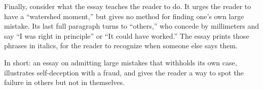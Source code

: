 \begin{afterword}
Finally, consider what the essay teaches the reader to do. It urges the reader to have a ``watershed moment,'' but gives no method for finding one's own large mistake. Its last full paragraph turns to ``others,'' who concede by millimeters and say ``I was right in principle'' or ``It could have worked.'' The essay prints those phrases in italics, for the reader to recognize when someone else says them.

In short: an essay on admitting large mistakes that withholds its own case, illustrates self-deception with a fraud, and gives the reader a way to spot the failure in others but not in themselves.
\end{afterword}
